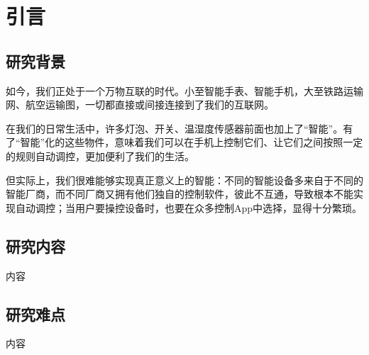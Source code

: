 \chapter{引言}

\section{研究背景}
如今，我们正处于一个万物互联的时代。小至智能手表、智能手机，大至铁路运输网、航空运输图，一切都直接或间接连接到了我们的互联网。

在我们的日常生活中，许多灯泡、开关、温湿度传感器前面也加上了“智能”。有了“智能”化的这些物件，意味着我们可以在手机上控制它们、让它们之间按照一定的规则自动调控，更加便利了我们的生活。

但实际上，我们很难能够实现真正意义上的智能：不同的智能设备多来自于不同的智能厂商，而不同厂商又拥有他们独自的控制软件，彼此不互通，导致根本不能实现自动调控；当用户要操控设备时，也要在众多控制App中选择，显得十分繁琐。

\section{研究内容}
内容

\section{研究难点}
内容
